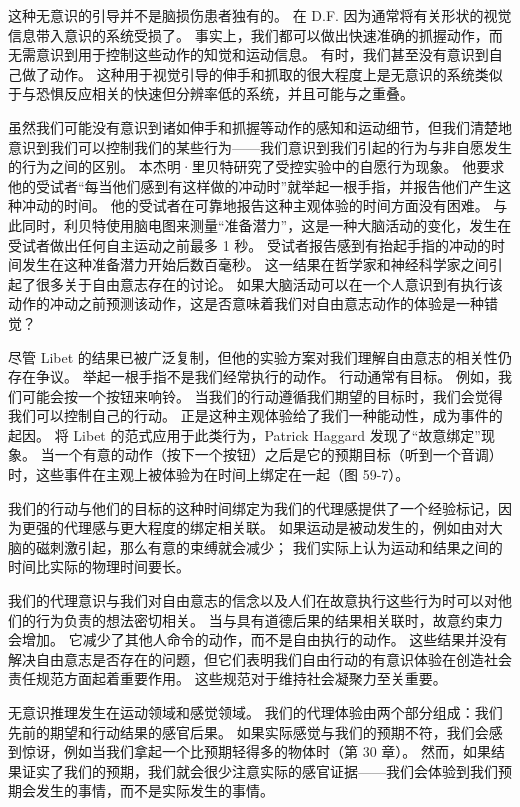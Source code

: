 这种无意识的引导并不是脑损伤患者独有的。 在 D.F. 因为通常将有关形状的视觉信息带入意识的系统受损了。 事实上，我们都可以做出快速准确的抓握动作，而无需意识到用于控制这些动作的知觉和运动信息。 有时，我们甚至没有意识到自己做了动作。 这种用于视觉引导的伸手和抓取的很大程度上是无意识的系统类似于与恐惧反应相关的快速但分辨率低的系统，并且可能与之重叠。

虽然我们可能没有意识到诸如伸手和抓握等动作的感知和运动细节，但我们清楚地意识到我们可以控制我们的某些行为——我们意识到我们引起的行为与非自愿发生的行为之间的区别。 本杰明·里贝特研究了受控实验中的自愿行为现象。 他要求他的受试者“每当他们感到有这样做的冲动时”就举起一根手指，并报告他们产生这种冲动的时间。 他的受试者在可靠地报告这种主观体验的时间方面没有困难。 与此同时，利贝特使用脑电图来测量“准备潜力”，这是一种大脑活动的变化，发生在受试者做出任何自主运动之前最多 1 秒。 受试者报告感到有抬起手指的冲动的时间发生在这种准备潜力开始后数百毫秒。 这一结果在哲学家和神经科学家之间引起了很多关于自由意志存在的讨论。 如果大脑活动可以在一个人意识到有执行该动作的冲动之前预测该动作，这是否意味着我们对自由意志动作的体验是一种错觉？

尽管 Libet 的结果已被广泛复制，但他的实验方案对我们理解自由意志的相关性仍存在争议。 举起一根手指不是我们经常执行的动作。 行动通常有目标。 例如，我们可能会按一个按钮来响铃。 当我们的行动遵循我们期望的目标时，我们会觉得我们可以控制自己的行动。 正是这种主观体验给了我们一种能动性，成为事件的起因。 将 Libet 的范式应用于此类行为，Patrick Haggard 发现了“故意绑定”现象。 当一个有意的动作（按下一个按钮）之后是它的预期目标（听到一个音调）时，这些事件在主观上被体验为在时间上绑定在一起（图 59-7）。

我们的行动与他们的目标的这种时间绑定为我们的代理感提供了一个经验标记，因为更强的代理感与更大程度的绑定相关联。 如果运动是被动发生的，例如由对大脑的磁刺激引起，那么有意的束缚就会减少； 我们实际上认为运动和结果之间的时间比实际的物理时间要长。

我们的代理意识与我们对自由意志的信念以及人们在故意执行这些行为时可以对他们的行为负责的想法密切相关。 当与具有道德后果的结果相关联时，故意约束力会增加。 它减少了其他人命令的动作，而不是自由执行的动作。 这些结果并没有解决自由意志是否存在的问题，但它们表明我们自由行动的有意识体验在创造社会责任规范方面起着重要作用。 这些规范对于维持社会凝聚力至关重要。

无意识推理发生在运动领域和感觉领域。 我们的代理体验由两个部分组成：我们先前的期望和行动结果的感官后果。 如果实际感觉与我们的预期不符，我们会感到惊讶，例如当我们拿起一个比预期轻得多的物体时（第 30 章）。 然而，如果结果证实了我们的预期，我们就会很少注意实际的感官证据——我们会体验到我们预期会发生的事情，而不是实际发生的事情。

